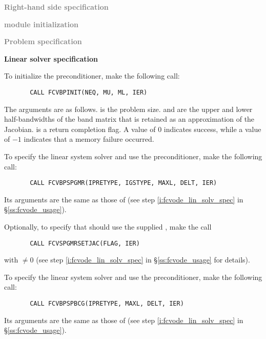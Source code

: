 \begin{Steps}
  
\item \textcolor{gray}{\bf Right-hand side specification}

\item \textcolor{gray}{\bf {\nvector} module initialization}

\item \textcolor{gray}{\bf Problem specification}

\item {\bf Linear solver specification}

  To initialize the {\cvbandpre} preconditioner, make the following call:
\begin{verbatim}
       CALL FCVBPINIT(NEQ, MU, ML, IER)
\end{verbatim}
  The arguments are as follows.
   is the problem size.
   and  are the upper and lower half-bandwidths of the band matrix
  that  is retained as an approximation of the Jacobian.
   is a return completion flag.  A value of $0$ indicates success, while 
  a value of $-1$ indicates that a memory failure occurred.
  
  To specify the {\spgmr} linear system solver and use the {\cvbandpre}
  preconditioner, make the following call:
\begin{verbatim}
       CALL FCVBPSPGMR(IPRETYPE, IGSTYPE, MAXL, DELT, IER)
\end{verbatim}
  Its arguments are the same as those of 
  (see step \ref{i:fcvode_lin_solv_spec} in \S\ref{ss:fcvode_usage}).
  
  Optionally, to specify that {\spgmr} should use the supplied , 
  make the call
\begin{verbatim}
       CALL FCVSPGMRSETJAC(FLAG, IER)
\end{verbatim}
  with  $\neq 0$ 
  (see step \ref{i:fcvode_lin_solv_spec} in \S\ref{ss:fcvode_usage} for details).
  

  To specify the {\spbcg} linear system solver and use the {\cvbandpre}
  preconditioner, make the following call:
\begin{verbatim}
       CALL FCVBPSPBCG(IPRETYPE, MAXL, DELT, IER)
\end{verbatim}
  Its arguments are the same as those of 
  (see step \ref{i:fcvode_lin_solv_spec} in \S\ref{ss:fcvode_usage}).
  

\end{Steps}
